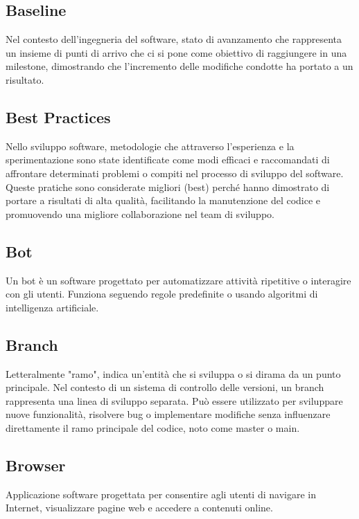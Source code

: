 \hypertarget{sec:baseline}{}
\subsection*{Baseline}
Nel contesto dell'ingegneria del software, stato di avanzamento che rappresenta un insieme di punti di arrivo che ci si pone come obiettivo di raggiungere 
in una milestone, dimostrando che l'incremento delle modifiche condotte ha portato a un risultato.

\subsection*{Best Practices}
Nello sviluppo software, metodologie che attraverso l’esperienza e la sperimentazione sono state identificate come modi efficaci e raccomandati di 
affrontare determinati problemi o compiti nel processo di sviluppo del software. Queste pratiche sono considerate migliori (best) perché hanno dimostrato 
di portare a risultati di alta qualità, facilitando la manutenzione del codice e promuovendo una migliore collaborazione nel team di sviluppo.

\hypertarget{sec:Bot}{}
\subsection*{Bot}
Un bot è un software progettato per automatizzare attività ripetitive o interagire con gli utenti. 
Funziona seguendo regole predefinite o usando algoritmi di intelligenza artificiale.

\hypertarget{sec:branch}{}
\subsection*{Branch}
Letteralmente "ramo", indica un’entità che si sviluppa o si dirama da un punto principale. Nel contesto di un sistema di controllo delle versioni, 
un branch rappresenta una linea di sviluppo separata. Può essere utilizzato per sviluppare nuove funzionalità, risolvere bug o implementare modifiche 
senza influenzare direttamente il ramo principale del codice, noto come master o main.

\hypertarget{sec:browser}{}
\subsection*{Browser}
Applicazione software progettata per consentire agli utenti di navigare in Internet, visualizzare pagine web e accedere a contenuti online.

